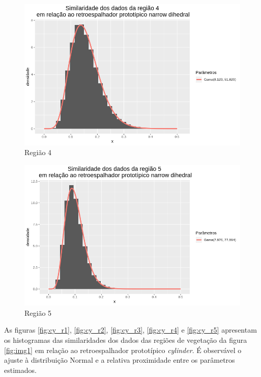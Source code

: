\documentclass[12pt]{article}
\begin{document}
\begin{figure}[!h]
    \centering
    \vspace{0.1\linewidth}
    \includegraphics[width = \linewidth]{../../Images/Report_18_12_20/nd_region4.png}
    \caption{Região 4}
    \label{fig:nd_r4}
\end{figure}

\begin{figure}[!h]
    \centering
    \includegraphics[width = \linewidth]{../../Images/Report_18_12_20/nd_region5.png}
    \caption{Região 5}
    \label{fig:nd_r5}
\end{figure}

As figuras \ref{fig:cy_r1}, \ref{fig:cy_r2}, \ref{fig:cy_r3}, \ref{fig:cy_r4} e \ref{fig:cy_r5} apresentam os histogramas das similaridades dos dados das regiões de vegetação da figura \ref{fig:img1} em relação ao retroespalhador prototípico \textit{cylinder}. É observável o ajuste à distribuição Normal e a relativa proximidade entre os parâmetros estimados.
\end{document}
